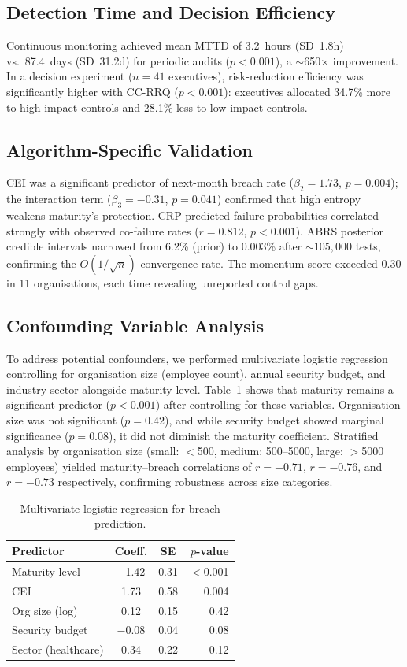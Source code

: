 \documentclass[conference]{IEEEtran}
\begin{document}
\subsection{Detection Time and Decision Efficiency}
Continuous monitoring achieved mean MTTD of 3.2~hours (SD~1.8h) vs.\ 87.4~days (SD~31.2d) for periodic audits ($p<0.001$), a $\sim$650$\times$ improvement. In a decision experiment ($n=41$ executives), risk-reduction efficiency was significantly higher with CC-RRQ ($p<0.001$): executives allocated 34.7\% more to high-impact controls and 28.1\% less to low-impact controls.

\subsection{Algorithm-Specific Validation}
CEI was a significant predictor of next-month breach rate ($\beta_2=1.73$, $p=0.004$); the interaction term ($\beta_3=-0.31$, $p=0.041$) confirmed that high entropy weakens maturity's protection. CRP-predicted failure probabilities correlated strongly with observed co-failure rates ($r=0.812$, $p<0.001$). ABRS posterior credible intervals narrowed from 6.2\% (prior) to 0.003\% after ${\sim}105{,}000$ tests, confirming the $O(1/\sqrt{n})$ convergence rate. The momentum score exceeded 0.30 in 11 organisations, each time revealing unreported control gaps.

\subsection{Confounding Variable Analysis}
\label{sec:confounding}
To address potential confounders, we performed multivariate logistic regression controlling for organisation size (employee count), annual security budget, and industry sector alongside maturity level. Table~\ref{tab:confounding} shows that maturity remains a significant predictor ($p<0.001$) after controlling for these variables. Organisation size was not significant ($p=0.42$), and while security budget showed marginal significance ($p=0.08$), it did not diminish the maturity coefficient. Stratified analysis by organisation size (small: $<$500, medium: 500--5000, large: $>$5000 employees) yielded maturity--breach correlations of $r=-0.71$, $r=-0.76$, and $r=-0.73$ respectively, confirming robustness across size categories.

\begin{table}[h]
  \centering
  \caption{Multivariate logistic regression for breach prediction.}
  \label{tab:confounding}
  \begin{tabular}{lccr}
    \toprule
    Predictor & Coeff. & SE & $p$-value \\
    \midrule
    Maturity level     & $-$1.42 & 0.31 & $<$0.001 \\
    CEI                & 1.73    & 0.58 & 0.004 \\
    Org size (log)     & 0.12    & 0.15 & 0.42 \\
    Security budget    & $-$0.08 & 0.04 & 0.08 \\
    Sector (healthcare) & 0.34   & 0.22 & 0.12 \\
    \bottomrule
  \end{tabular}
\end{table}
\end{document}
